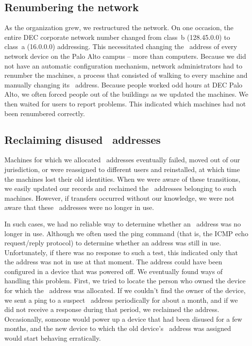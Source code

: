 \subsection{Renumbering the network}
As the organization grew, we restructured the network.
On one occasion, the entire \acs{DEC} corporate network number changed from class~b (128.45.0.0) to class~a (16.0.0.0) addressing.
This necessitated changing the \IP\ address of every network device on the Palo Alto campus -- more than  computers.
Because we did not have an automatic configuration mechanism, network administrators had to renumber the machines, a process that consisted of walking to every machine and manually changing its \IP\ address.
Because people worked odd hours at \acs{DEC} Palo Alto, we often forced people out of the buildings as we updated the machines.
We then waited for users to report problems.
This indicated which machines had not been renumbered correctly.

\subsection{Reclaiming disused \IP\ addresses}
Machines for which we allocated \IP\ addresses eventually failed, moved out of our jurisdiction, or were reassigned to different users and reinstalled, at which time the machines lost their old identities.
When we were aware of these transitions, we easily updated our records and reclaimed the \IP\ addresses belonging to such machines.
However, if transfers occurred without our knowledge, we were not aware that these \IP\ addresses were no longer in use.

In such cases, we had no reliable way to determine whether an \IP\ address was no longer in use.
Although we often used the ping command (that is, the \acs{ICMP} echo request/reply protocol) to determine whether an address was still in use.
Unfortunately, if there was no response to such a test, this indicated only that the address was not in use at that moment.
The address could have been configured in a device that was powered off.
We eventually found ways of handling this problem.
First, we tried to locate the person who owned the device for which the \IP\ address was allocated.
If we couldn't find the owner of the device, we sent a ping to a suspect \IP\ address periodically for about a month, and if we did not receive a response during that period, we reclaimed the address.
Occasionally, someone would power up a device that had been disused for a few months, and the new device to which the old device's \IP\ address was assigned would start behaving erratically.